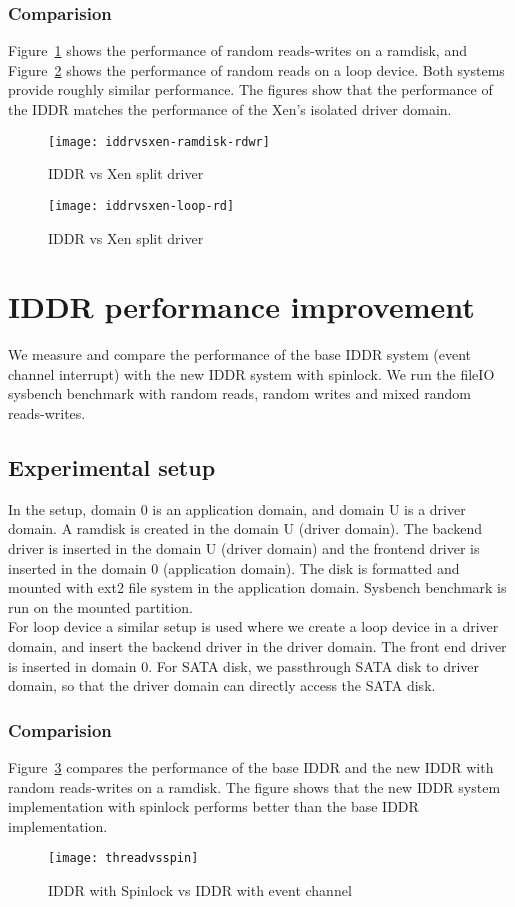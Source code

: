 \subsubsection*{Comparision}
Figure~\ref{fig:iddrvsxen-ramdisk-rdwr} shows the performance of random reads-writes on a ramdisk, and Figure~\ref{fig:iddrvsxen-loop-rd} shows the performance of random reads on a loop device. Both systems provide roughly similar performance. The figures show that the performance of the IDDR matches the performance of the Xen's isolated driver domain. 
\begin{figure}[!ht]
\centering
\texttt{[image: iddrvsxen-ramdisk-rdwr]}
\caption{IDDR vs Xen split driver}
\label{fig:iddrvsxen-ramdisk-rdwr}
\end{figure}
\begin{figure}[!ht]
\centering
\texttt{[image: iddrvsxen-loop-rd]}
\caption{IDDR vs Xen split driver}
\label{fig:iddrvsxen-loop-rd}
\end{figure}

\section{IDDR performance improvement}
We measure and compare the performance of the base IDDR system (event channel interrupt) with the new IDDR system with spinlock. We run the fileIO sysbench benchmark with random reads, random writes and mixed random reads-writes. 
\subsection{Experimental setup}
In the setup, domain 0 is an application domain, and domain U is a driver domain. A ramdisk is created in the domain U (driver domain). The backend driver is inserted in the domain U (driver domain) and the frontend driver is inserted in the domain 0 (application domain). The disk is formatted and mounted with ext2 file system in the application domain. Sysbench benchmark is run on the mounted partition. 
\\[3mm]
For loop device a similar setup is used where we create a loop device in a driver domain, and insert the backend driver in the driver domain. The front end driver is inserted in domain 0. For SATA disk, we passthrough SATA disk to driver domain, so that the driver domain can directly access the SATA disk. 
\subsubsection*{Comparision}
Figure~\ref{fig:threadvsspin} compares the performance of the base IDDR and the new IDDR with random reads-writes on a ramdisk. The figure shows that the new IDDR system implementation with spinlock performs better than the base IDDR implementation. 
\begin{figure}[!ht]
\centering
\texttt{[image: threadvsspin]}
\caption{IDDR with Spinlock vs IDDR with event channel}
\label{fig:threadvsspin}
\end{figure}

